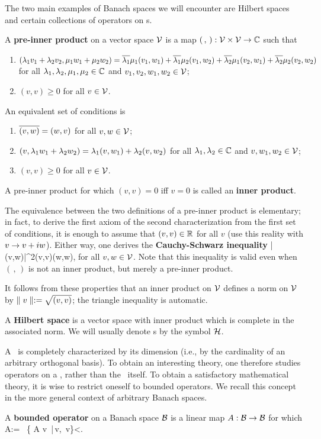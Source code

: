 The two main examples of Banach spaces we will encounter are Hilbert
spaces and certain collections of operators on \Hs s.
\begin{Definition}
 A {\bf pre-inner product} on a vector space ${\cal V}$ is a map $(\,
,\,):{\cal V}\times{\cal V}\rightarrow{\Bbb C}$ such that
\begin{enumerate}
\item
$(\lambda_1 v_1+\lambda_2 v_2,\mu_1 w_1+\mu_2 w_2)=\overline{\lambda_1}\mu_1(v_1,w_1)+
\overline{\lambda_1}\mu_2(v_1,w_2)+\overline{\lambda_2}\mu_1(v_2,w_1)+\overline{\lambda_2}\mu_2(v_2,w_2)$
for all $\lambda_1,\lambda_2,\mu_1,\mu_2\in{\Bbb C}$ and $v_1,v_2,w_1,w_2\in{\cal V}$;
\item
$(v,v)\geq 0$ for all $v\in{\cal V}$.
\end{enumerate}
An equivalent set of conditions is
\begin{enumerate}
\item
$\overline{(v,w)}=(w,v)$ for all $v,w\in{\cal V}$;
\item
$(v,\lambda_1 w_1+\lambda_2 w_2)=\lambda_1(v,w_1)+\lambda_2(v,w_2)$ for all
$\lambda_1,\lambda_2\in{\Bbb C}$ and $v,w_1,w_2\in{\cal V}$;
\item
$(v,v)\geq 0$ for all $v\in{\cal V}$.
\end{enumerate}
A pre-inner product for which $(v,v)=0$ iff $v=0$ is called an {\bf
inner product}.  \end{Definition}

The equivalence between the two definitions of a pre-inner product is
elementary; in fact, to derive the first axiom of the second
characterization from the first set of conditions, it is enough to
assume that $(v,v)\in{\Bbb R}$ for all $v$ (use this reality with $v\rightarrow
v+iw$).  Either way, one derives the {\bf Cauchy-Schwarz inequality}
\be |(v,w)|^2\leq (v,v)(w,w),  \ee for all $v,w\in{\cal V}$. Note
that this inequality is valid even when $(\, ,\,)$ is not an inner
product, but merely a pre-inner product.

It follows from these properties that an inner product on ${\cal V}$
defines a norm on ${\cal V}$ by $\parallel v\parallel:=\sqrt{(v,v)}$; the triangle
inequality is automatic.
\begin{Definition}
A {\bf Hilbert space} is a vector space with inner product which is
complete in the associated norm. We will usually denote \Hs s by the
symbol ${\cal H}$. \end{Definition}

A \Hs\ is completely characterized by its dimension (i.e., by the
cardinality of an arbitrary orthogonal basis). To obtain an
interesting theory, one therefore studies operators on a \Hs, rather
than the \Hs\ itself. To obtain a satisfactory mathematical theory, it
is wise to restrict oneself to bounded operators. We recall this
concept in the more general context of arbitrary Banach spaces.
\begin{Definition} 
A {\bf bounded operator} on a Banach space ${\cal B}$ is a linear map
$A:{\cal B}\rightarrow{\cal B}$ for which \be \n A\n:= \sup\, \{ \n A v\n\,
|\,v\in\CB,\, \n v\}<\infty.   \ee
\end{Definition}
 
